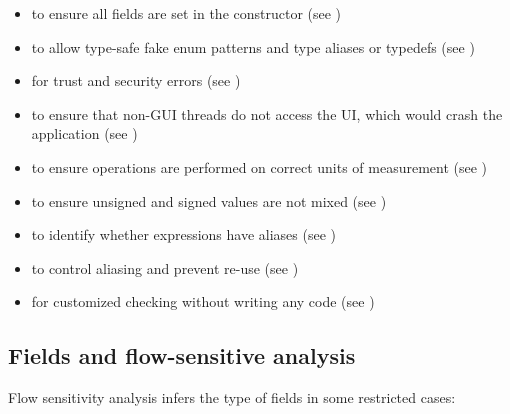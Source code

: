 \begin{itemize}
\item
   to ensure all
  fields are set in the constructor (see
  )
\item
   to allow type-safe fake enum
  patterns and type aliases or typedefs (see )
\item
   for trust and security errors
  (see )
\item
   to ensure that non-GUI
  threads do not access the UI, which would crash the application
  (see )
\item
   to ensure operations are
  performed on correct units of measurement
  (see )
\item
   to
  ensure unsigned and signed values are not mixed
  (see )
\item
   to identify whether
  expressions have aliases (see )
\item
   to control aliasing and prevent
  re-use (see )
\item
   for customized checking without
  writing any code (see )
\end{itemize}



\subsection{Fields and flow-sensitive analysis\label{type-refinement-fields}}

Flow sensitivity analysis infers the type of fields in some restricted cases:

